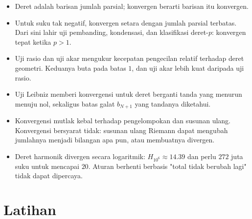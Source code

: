 \begin{ringkasan}
\begin{itemize}
\item Deret adalah barisan jumlah parsial; konvergen berarti barisan itu konvergen.
\item Untuk suku tak negatif, konvergen setara dengan jumlah parsial terbatas. Dari
      sini lahir uji pembanding, kondensasi, dan klasifikasi deret-$p$: konvergen
      tepat ketika $p>1$.
\item Uji rasio dan uji akar mengukur kecepatan pengecilan relatif terhadap deret
      geometri. Keduanya buta pada batas $1$, dan uji akar lebih kuat daripada uji
      rasio.
\item Uji Leibniz memberi konvergensi untuk deret berganti tanda yang menurun menuju
      nol, sekaligus batas galat $b_{N+1}$ yang tandanya diketahui.
\item Konvergensi mutlak kebal terhadap pengelompokan dan susunan ulang. Konvergensi
      bersyarat tidak: susunan ulang Riemann dapat mengubah jumlahnya menjadi
      bilangan apa pun, atau membuatnya divergen.
\item Deret harmonik divergen secara logaritmik: $H_{10^6} \approx 14.39$ dan perlu
      $272$ juta suku untuk mencapai $20$. Aturan berhenti berbasis "total tidak
      berubah lagi" tidak dapat dipercaya.
\end{itemize}
\end{ringkasan}

\section{Latihan}

